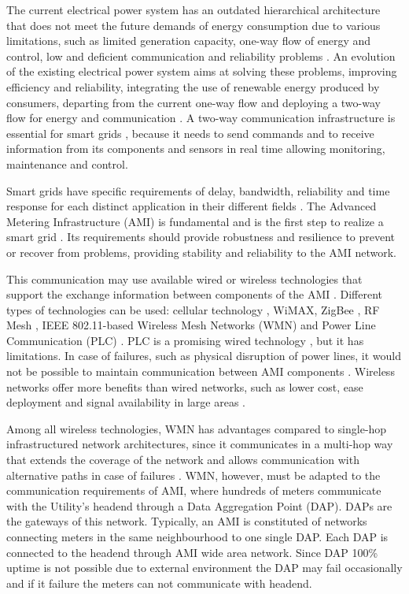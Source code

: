 \documentclass[conference]{IEEEtran}
\begin{document}
The current electrical power system has an outdated hierarchical architecture that does not meet the future demands of energy consumption due to various limitations, such as limited generation capacity, one-way flow of energy and control, low and deficient communication and reliability problems \cite{Farhangi2010}. 
An evolution of the existing electrical power system aims at solving these problems, improving efficiency and reliability, integrating the use of renewable energy produced by consumers, departing from the current one-way flow and deploying a two-way flow for energy and communication \cite {Farhangi2010,Moslehi2010}. A two-way communication infrastructure is essential for smart grids \cite{Gungor2011}, because it needs to send commands and to receive information from its components and sensors in real time allowing monitoring, maintenance and control.

Smart grids have specific requirements of delay, bandwidth, reliability and time response for each distinct application in their different fields \cite{Gungor2011}. The Advanced Metering Infrastructure (AMI) is fundamental and is the first step to realize a smart grid \cite{4781067,5484223}. Its requirements should provide robustness and resilience to prevent or recover from problems, providing stability and reliability to the AMI network. 

This communication may use available wired or wireless technologies that support the exchange information between components of the AMI \cite{Saputro2012,4547164}. Different types of technologies can be used: cellular technology \cite{5589988}, WiMAX, ZigBee \cite{5589988}, RF Mesh \cite{5622071}, IEEE 802.11-based Wireless Mesh Networks (WMN) and Power Line Communication (PLC) \cite{5479945}. PLC is a promising wired technology \cite{Saputro2012}, but it has limitations. In case of failures, such as physical disruption of power lines, it would not be possible to maintain communication between AMI components \cite{Gungor2006}. Wireless networks offer more benefits than wired networks, such as lower cost, ease deployment and signal availability in large areas \cite{5589988}. 

Among all wireless technologies, WMN has advantages compared to single-hop infrastructured network architectures, since it communicates in a multi-hop way that extends the coverage of the network and allows communication with alternative paths in case of failures \cite{5622071,Fang2012}. WMN, however, must be adapted to the communication requirements of AMI, where hundreds of meters communicate with the Utility's headend through a Data Aggregation Point (DAP). DAPs are the gateways of this network. Typically, an AMI is constituted of networks connecting meters in the same neighbourhood to one single DAP. Each DAP is connected to the headend through AMI wide area network. Since DAP 100\% uptime is not possible due to external environment the DAP may fail occasionally and if it failure the meters can not communicate with headend.
\end{document}
